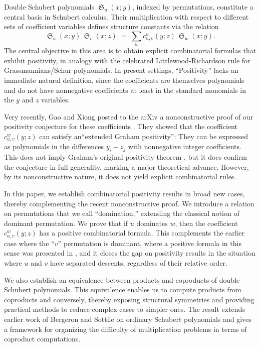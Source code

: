 \documentclass{amsart}
\theoremstyle{definition}
\theoremstyle{remark}
\numberwithin{equation}{subsection}
\DeclareMathOperator{\sch}{\mathfrak{S}}
\begin{document}
Double Schubert polynomials $\sch_u(x;y)$, indexed by permutations, constitute a central basis in Schubert calculus. Their multiplication with respect to different sets of coefficient variables defines structure constants via the relation
\begin{equation*}
	\sch_u(x;y)\,\sch_v(x;z)\;=\;\sum_w c^w_{u,v}(y;z)\,\sch_w(x;y).
\end{equation*}
The central objective in this area is to obtain explicit combinatorial formulas that exhibit positivity, in analogy with the celebrated Littlewood-Richardson rule for Grassmannians/Schur polynomials. In present settings, ``Positivity'' lacks an immediate natural definition, since the coefficients are themselves polynomials and do not have nonnegative coefficients at least in the standard monomials in the $y$ and $z$ variables.

Very recently, Gao and Xiong \cite{gao2025grahampositivitytripleschubert} posted to the arXiv a nonconstructive proof of our positivity conjecture for these coefficients \cite[Conjecture~1.1]{samuelmolev}\cite{gao2025grahampositivitytripleschubert}. They showed that the coefficient $c_{u,v}^w(y;z)$ can satisfy an``extended Graham positivity'': They can be expressed as polynomials in the differences $y_i-z_j$ with nonnegative integer coefficients. This does not imply Graham's original positivity theorem \cite{graham2001positivity}, but it does confirm the conjecture in full generality, marking a major theoretical advance. However, by its nonconstructive nature, it does not yield explicit combinatorial rules.

In this paper, we establish combinatorial positivity results in broad new cases, thereby complementing the recent nonconstructive proof. We introduce a relation on permutations that we call ``domination,'' extending the classical notion of dominant permutation. We prove that if $u$ dominates $w$, then the coefficient $c^w_{u,v}(y;z)$ has a positive combinatorial formula. This complements the earlier case where the ``$v$'' permutation is dominant, where a positive formula in this sense was presented in \cite{samuelmolev}, and it closes the gap on positivity results in the situation where $u$ and $v$ have separated descents, regardless of their relative order.

We also establish an equivalence between products and coproducts of double Schubert polynomials. This equivalence enables us to compute products from coproducts and conversely, thereby exposing structural symmetries and providing practical methods to reduce complex cases to simpler ones. The result extends earlier work of Bergeron and Sottile on ordinary Schubert polynomials and gives a framework for organizing the difficulty of multiplication problems in terms of coproduct computations.
\end{document}
